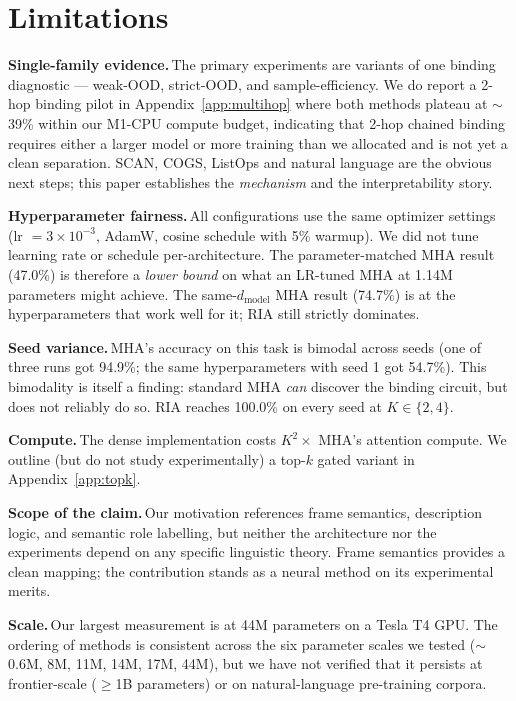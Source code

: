 \documentclass{article}
\begin{document}
\section{Limitations}
\label{sec:limitations}

\textbf{Single-family evidence.}\,The primary experiments are
variants of one binding diagnostic --- weak-OOD, strict-OOD, and
sample-efficiency. We do report a 2-hop binding pilot in
Appendix~\ref{app:multihop} where both methods plateau at $\sim$39\%
within our M1-CPU compute budget, indicating that 2-hop chained
binding requires either a larger model or more training than we
allocated and is not yet a clean separation. SCAN, COGS, ListOps and
natural language are the obvious next steps; this paper establishes
the \emph{mechanism} and the interpretability story.

\textbf{Hyperparameter fairness.}\,All configurations use the same
optimizer settings (lr $= 3\times 10^{-3}$, AdamW, cosine schedule with
5\% warmup). We did not tune learning rate or schedule per-architecture.
The parameter-matched MHA result (47.0\%) is therefore a
\emph{lower bound} on what an LR-tuned MHA at 1.14M parameters might
achieve. The same-$d_{\text{model}}$ MHA result (74.7\%) is at the
hyperparameters that work well for it; RIA still strictly dominates.

\textbf{Seed variance.}\,MHA's accuracy on this task is bimodal across
seeds (one of three runs got 94.9\%; the same hyperparameters with
seed 1 got 54.7\%). This bimodality is itself a finding: standard MHA
\emph{can} discover the binding circuit, but does not reliably do so.
RIA reaches 100.0\% on every seed at $K \in \{2, 4\}$.

\textbf{Compute.}\,The dense implementation costs $K^2 \times$ MHA's
attention compute. We outline (but do not study experimentally) a
top-$k$ gated variant in Appendix~\ref{app:topk}.

\textbf{Scope of the claim.}\,Our motivation references frame
semantics, description logic, and semantic role labelling, but
neither the architecture nor the experiments depend on any specific
linguistic theory. Frame semantics provides a clean mapping; the
contribution stands as a neural method on its experimental merits.

\textbf{Scale.}\,Our largest measurement is at 44M parameters on a
Tesla T4 GPU. The ordering of methods is consistent across the six
parameter scales we tested ($\sim$0.6M, 8M, 11M, 14M, 17M, 44M), but
we have not verified that it persists at frontier-scale ($\geq$1B
parameters) or on natural-language pre-training corpora.
\end{document}
